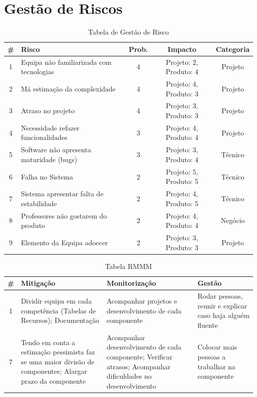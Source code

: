\documentclass[a4paper]{report}
\begin{document}
\section{Gestão de Riscos}
\label{GR}
\begin{table}[h]
\centering
\begin{tabularx}{\textwidth}{c|X|c|c|c}
\# & Risco & Prob. & Impacto & Categoria \\ \hline
1  & Equipa não familiarizada com tecnologias & 4           & Projeto: 2, Produto: 4  & Projeto   \\ \hline
2  & Má estimação da complexidade             & 4           & Projeto: 4, Produto: 3  & Projeto   \\ \hline
3  & Atraso no projeto                        & 4           & Projeto: 3, Produto: 3 & Projeto   \\ \arrayrulecolor{red}\hline\arrayrulecolor{black}
4  & Necessidade refazer funcionalidades      & 3           & Projeto: 4, Produto: 4  & Projeto   \\ \hline
5  & Software não apresenta maturidade (bugs) & 3           & Projeto: 3, Produto: 4  & Técnico   \\ \hline
6  & Falha no Sistema                         & 2           & Projeto: 5, Produto: 5  & Técnico   \\ \hline
7  & Sistema apresentar falta de estabilidade & 2           & Projeto: 4, Produto: 5  & Técnico   \\ \hline
8  & Professores não gostarem do produto      & 2           & Projeto: 4, Produto: 4  & Negócio   \\ \hline
9  & Elemento da Equipa adoecer               & 2           & Projeto: 3, Produto: 3  & Projeto    
\end{tabularx}
\caption{Tabela de Gestão de Risco}
\label{TabGR}
\end{table}
\begin{table}[h]
\centering
\begin{tabularx}{\textwidth}{c|X|X|X}
\# & Mitigação  & Monitorização & Gestão \\ \hline
1  & Dividir equipa em cada competência (Tabelas de Recursos); Documentação                                     & Acompanhar projetos e desenvolvimento de cada componente                                                     & Rodar pessoas, reunir e explicar caso haja alguém fluente \\ \hline
7  & Tendo em conta a estimação pessimista faz se uma maior divisão de componentes; Alargar prazo da componente & Acompanhar desenvolvimento de cada componente; Verificar atrasos; Acompanhar dificuldades no desenvolvimento & Colocar mais pessoas a trabalhar na componente         
\end{tabularx}
\caption{Tabela RMMM}
\label{TabRIMM}
\end{table}
\end{document}
